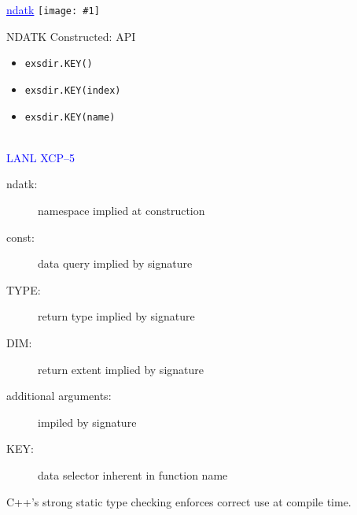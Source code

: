 \documentclass[clock]{slides}
\newenvironment{xslide}[1][logo.jpg]{\begin{slide} \tiny
\textcolor{blue}{\underline{ndatk}} \hfill
\texttt{[image: \#1]}
\normalsize}{\vfill\tiny
\textcolor{blue}{\hrulefill \\LANL XCP--5}
\end{slide}}
\begin{document}
\begin{xslide}
\begin{center}\Large
NDATK Constructed: API
\end{center}

\begin{itemize}
\item \verb+exsdir.KEY()+
\item \verb+exsdir.KEY(index)+
\item \verb+exsdir.KEY(name)+
\end{itemize}
\end{xslide}

\begin{note}\small
\begin{description}
\item[ndatk: ] namespace implied at construction
\item[const: ] data query implied by signature
\item[TYPE: ] return type implied by signature
\item[DIM: ] return extent implied by signature
\item[additional arguments: ] impiled by signature
\item[KEY: ] data selector inherent in function name
\end{description}
C++'s strong static type checking enforces correct use at compile time. 
\end{note}    
\end{document}
